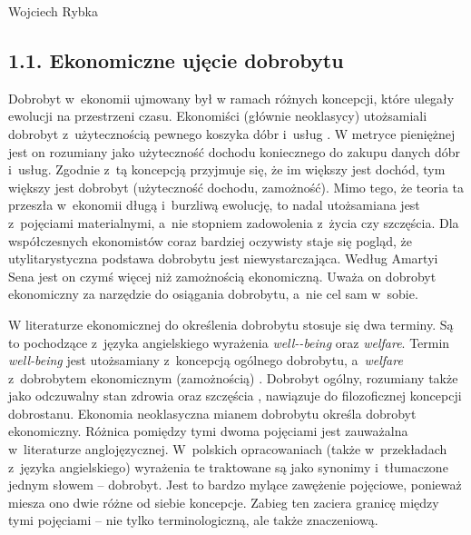 \begin{artplenv}{Wojciech Rybka}
\subsection{1.1. Ekonomiczne ujęcie dobrobytu}
Dobrobyt w~ekonomii ujmowany był w ramach różnych koncepcji, które ulegały ewolucji na przestrzeni czasu. Ekonomiści (głównie
neoklasycy) utożsamiali dobrobyt z~użytecznością pewnego koszyka dóbr i~usług
\parencite{kot_dobrobyt_2004}.
W metryce pieniężnej jest on rozumiany jako użyteczność dochodu koniecznego do zakupu danych dóbr i~usług.
Zgodnie z~tą koncepcją przyjmuje się, że im większy jest dochód, tym większy jest dobrobyt (użyteczność dochodu,
zamożność). Mimo tego, że teoria ta przeszła w~ekonomii długą  i~burzliwą ewolucję, to nadal utożsamiana
jest z~pojęciami materialnymi, a~nie stopniem zadowolenia z~życia czy szczęścia. Dla współczesnych ekonomistów coraz bardziej
oczywisty staje się pogląd, że utylitarystyczna podstawa dobrobytu jest niewystarczająca. Według Amartyi Sena jest on
czymś więcej niż zamożnością ekonomiczną. Uważa on dobrobyt ekonomiczny za narzędzie do osiągania dobrobytu, a~nie cel
sam w~sobie. 

W literaturze ekonomicznej do określenia dobrobytu stosuje się dwa terminy. Są to pochodzące z~języka angielskiego
wyrażenia \textit{well-\mbox{-being}} oraz \textit{welfare}. Termin \textit{well-being} jest utożsamiany z~koncepcją ogólnego
dobrobytu, a~\textit{welfare} z~dobrobytem ekonomicznym (zamożnością)
\parencite{kot_dobrobyt_2004}.
Dobrobyt ogólny, rozumiany także jako odczuwalny stan zdrowia oraz szczęścia
\parencite{noauthor_well-being_2019}, nawiązuje do filozoficznej koncepcji dobrostanu.
Ekonomia
neoklasyczna mianem dobrobytu określa dobrobyt ekonomiczny. Różnica pomiędzy tymi dwoma pojęciami jest
zauważalna w~literaturze anglojęzycznej. W~polskich opracowaniach (także w~przekładach z~języka angielskiego) wyrażenia te
traktowane są jako synonimy  i~tłumaczone jednym słowem -- dobrobyt. Jest to bardzo mylące zawężenie pojęciowe, ponieważ
miesza ono dwie różne od siebie koncepcje. Zabieg ten zaciera granicę między tymi pojęciami -- nie tylko terminologiczną,
ale także znaczeniową.


\end{artplenv}
